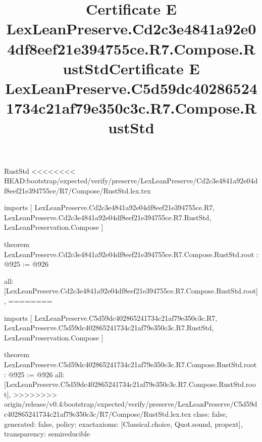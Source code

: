 \begin{lexlean}{RustStd}
<<<<<<<< HEAD:bootstrap/expected/verify/preserve/LexLeanPreserve/Cd2c3e4841a92e04df8eef21e394755ce/R7/Compose/RustStd.lex.tex
\title{Certificate E LexLeanPreserve.Cd2c3e4841a92e04df8eef21e394755ce.R7.Compose.RustStd}
\begin{coremodule}
imports [
  LexLeanPreserve.Cd2c3e4841a92e04df8eef21e394755ce.R7,
  LexLeanPreserve.Cd2c3e4841a92e04df8eef21e394755ce.R7.RustStd,
  LexLeanPreservation.Compose
]

theorem LexLeanPreserve.Cd2c3e4841a92e04df8eef21e394755ce.R7.Compose.RustStd.root : @925 := @926 {
  all: [LexLeanPreserve.Cd2c3e4841a92e04df8eef21e394755ce.R7.Compose.RustStd.root],
========
\title{Certificate E LexLeanPreserve.C5d59dc402865241734c21af79e350c3c.R7.Compose.RustStd}
\begin{coremodule}
imports [
  LexLeanPreserve.C5d59dc402865241734c21af79e350c3c.R7,
  LexLeanPreserve.C5d59dc402865241734c21af79e350c3c.R7.RustStd,
  LexLeanPreservation.Compose
]

theorem LexLeanPreserve.C5d59dc402865241734c21af79e350c3c.R7.Compose.RustStd.root : @925 := @926 {
  all: [LexLeanPreserve.C5d59dc402865241734c21af79e350c3c.R7.Compose.RustStd.root],
>>>>>>>> origin/release/v0.4:bootstrap/expected/verify/preserve/LexLeanPreserve/C5d59dc402865241734c21af79e350c3c/R7/Compose/RustStd.lex.tex
  class: false,
  generated: false,
  policy: exact{axioms: [Classical.choice, Quot.sound, propext]},
  transparency: semireducible
}


\end{coremodule}}
\end{coremodule}
\end{lexlean}
